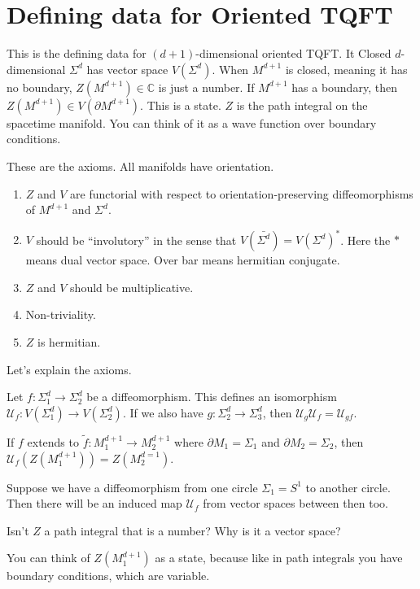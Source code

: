 \section{Defining data for Oriented TQFT}
This is the defining data for $(d + 1)$-dimensional oriented TQFT.
It Closed $d$-dimensional $\Sigma^d$
has vector space $V(\Sigma^d)$.
When $M^{d+1}$ is closed, meaning it has no boundary,
$Z(M^{d+1})\in\mathbb{C}$ is just a number.
If $M^{d+1}$ has a boundary,
then $Z(M^{d+1})\in V(\partial M^{d+1})$.
This is a state.
$Z$ is the path integral on the spacetime manifold.
You can think of it as a wave function over boundary conditions.

These are the axioms.
All manifolds have orientation.

\begin{enumerate}
    \item $Z$ and $V$ are functorial with respect to orientation-preserving
    diffeomorphisms of $M^{d+1}$ and $\Sigma^d$.
    \item $V$ should be ``involutory'' in the sense that
    $V(\bar{\Sigma^d}) = V(\Sigma^d)^*$.
    Here the $*$ means dual vector space.
    Over bar means hermitian conjugate.
    \item $Z$ and $V$ should be multiplicative.
    \item Non-triviality.
    \item $Z$ is hermitian.
\end{enumerate}

Let's explain the axioms.
\begin{axiom}[Axiom 1]
    Let $f:\Sigma_1^d \to \Sigma_2^d$ be a diffeomorphism.
    This defines an isomorphism
    $\mathcal{U}_f: V(\Sigma_1^d)\to V(\Sigma_2^d)$.
    If we also have $g: \Sigma_2^d \to \Sigma_3^d$,
    then
    $\mathcal{U}_g \mathcal{U}_f = \mathcal{U}_{gf}$.

    If $f$ extends to
    $\tilde{f}: M_1^{d+1}\to M_2^{d+1}$
    where $\partial M_1 = \Sigma_1$
    and $\partial M_2 = \Sigma_2$,
    then
    $\mathcal{U}_f\left( Z\left( M_1^{d+1} \right) \right)
    = Z\left( M_2^{d=1} \right)$.
\end{axiom}
Suppose we have a diffeomorphism from one circle $\Sigma_1 = S^1$ to another
circle.
Then there will be an induced map $\mathcal{U}_f$ from vector spaces between
then too.

\begin{question}
    Isn't $Z$ a path integral that is a number?
    Why is it a vector space?
\end{question}
You can think of $Z\left( M_1^{d+1} \right)$
as a state,
because like in path integrals you have boundary conditions,
which are variable.


